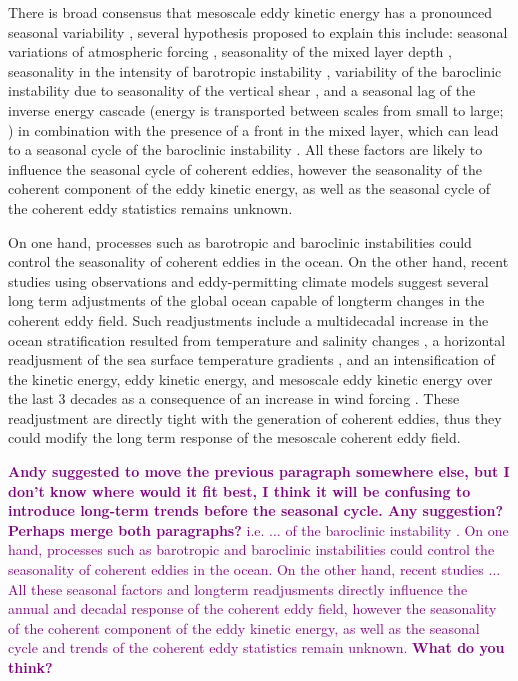 \documentclass[draft,linenumbers]{agujournal2019}
\begin{document}
There is broad consensus that mesoscale eddy kinetic energy has a pronounced seasonal variability \citep{Uchida_Seasonality_2017,Kang_On_2017,Qiu_seasonal_2004, Qiu_seasonal_1999}, several hypothesis proposed to explain this include: seasonal variations of atmospheric forcing \citep{Sasaki_seasonal_2014}, seasonality of the mixed layer depth \citep{Qiu_seasonal_2014,Callies_season_2015}, seasonality in the intensity of barotropic instability \citep{Qiu_seasonal_2004}, variability of the baroclinic instability due to seasonality of the vertical shear \citep{Qiu_seasonal_1999}, and a seasonal lag of the inverse energy cascade (energy is transported between scales from small to large; \citealp{Arbic_cascade_2013}) in combination with the presence of a front in the mixed layer, which can lead to a seasonal cycle of the baroclinic instability \citep{Qiu_seasonal_2014}. 
All  these factors are likely to influence the seasonal cycle of coherent eddies, however the seasonality of the coherent component of the eddy kinetic energy, as well as the seasonal cycle of the coherent eddy statistics remains unknown.


On one hand, processes such as barotropic and baroclinic instabilities could control the seasonality of coherent eddies in the ocean. 
On the other hand, recent studies using observations and eddy-permitting climate models suggest several long term adjustments of the global ocean capable of longterm changes in the coherent eddy field. 
Such readjustments include a multidecadal increase in the ocean stratification resulted from temperature and salinity changes \citep{Li_stratification_2020}, a horizontal readjusment of the sea surface temperature gradients \citep{Ruela_SST_trends_2020,Bouali_SST_grad_trends_2017,Cane_SST_trends_1997}, and an intensification of the kinetic energy, eddy kinetic energy, and mesoscale eddy kinetic energy over the last 3 decades as a consequence of an increase in wind forcing \citep{Hu_acceleration_2020,Wunsch_speeding_2020,Martinez_Kinetic_2021}. 
These readjustment are directly tight with the generation of coherent eddies, thus they could modify the long term response of the mesoscale coherent eddy field. 

\textcolor{purple}{\scriptsize \textbf{Andy suggested to move the previous paragraph somewhere else, but I don't know where would it fit best, I think it will be confusing to introduce long-term trends before the seasonal cycle. Any suggestion? Perhaps merge both paragraphs?} i.e. $\dots$ of the baroclinic instability \citep{Qiu_seasonal_2014}. On one hand, processes such as barotropic and baroclinic instabilities could control the seasonality of coherent eddies in the ocean.  On the other hand, recent studies $\dots$ All these seasonal factors and longterm readjusments directly influence the annual and decadal response of the coherent eddy field, however the seasonality of the coherent component of the eddy kinetic energy, as well as the seasonal cycle and trends of the coherent eddy statistics remain unknown. \textbf{What do you think?}}
\end{document}
